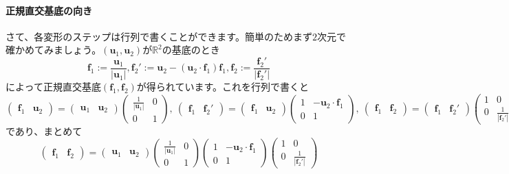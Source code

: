 \paragraph{正規直交基底の向き}

さて、各変形のステップは行列で書くことができます。簡単のためまず$2$次元で確かめてみましょう。$(\bm{u}_1, \bm{u}_2)$が$\mathbb{R}^2$の基底のとき
\[
\bm{f}_1 := \frac{\bm{u}_1}{|\bm{u}_1|}, \bm{f}_2' := \bm{u}_2 - (\bm{u}_2 \cdot \bm{f}_1)\bm{f}_1, \bm{f}_2 := \frac{\bm{f}_2'}{|\bm{f}_2'|}
\]
によって正規直交基底$(\bm{f}_1, \bm{f}_2)$が得られています。これを行列で書くと
\[
\begin{pmatrix}
\bm{f}_1 & \bm{u}_2
\end{pmatrix}
=
\begin{pmatrix}
\bm{u}_1 & \bm{u}_2
\end{pmatrix}
\begin{pmatrix}
\frac{1}{|\bm{u}_1|} & 0 \\
0 & 1
\end{pmatrix}, \ 
\begin{pmatrix}
\bm{f}_1 & \bm{f}_2'
\end{pmatrix}
=
\begin{pmatrix}
\bm{f}_1 & \bm{u}_2
\end{pmatrix}
\begin{pmatrix}
1 & -\bm{u}_2 \cdot \bm{f}_1 \\
0 & 1
\end{pmatrix}, \ 
\begin{pmatrix}
\bm{f}_1 & \bm{f}_2
\end{pmatrix}
=
\begin{pmatrix}
\bm{f}_1 & \bm{f}_2'
\end{pmatrix}
\begin{pmatrix}
1 & 0 \\
0 & \frac{1}{|\bm{f}_2'|}
\end{pmatrix}
\]
であり、まとめて
\[
\begin{pmatrix}
\bm{f}_1 & \bm{f}_2
\end{pmatrix}
=
\begin{pmatrix}
\bm{u}_1 & \bm{u}_2
\end{pmatrix}
\begin{pmatrix}
\frac{1}{|\bm{u}_1|} & 0 \\
0 & 1
\end{pmatrix}\begin{pmatrix}
1 & -\bm{u}_2 \cdot \bm{f}_1 \\
0 & 1
\end{pmatrix}
\begin{pmatrix}
1 & 0 \\
0 & \frac{1}{|\bm{f}_2'|}
\end{pmatrix}
\]
